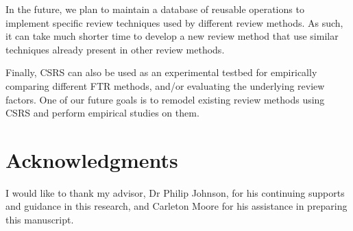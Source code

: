 In the future, we plan to maintain a database of reusable operations
to implement specific review techniques used by different review
methods. As such, it can take much shorter 
time to develop a new review method that use similar techniques
already present in other review methods.

Finally, CSRS can also be used as an experimental testbed for
empirically comparing different FTR methods, and/or evaluating the
underlying review factors. One of our future goals is to remodel
existing review methods using CSRS and perform empirical studies on
them. 


\section{Acknowledgments}

I would like to thank my advisor, Dr Philip Johnson, for his
continuing supports and guidance in this research,
and Carleton Moore for his assistance in preparing this manuscript.






